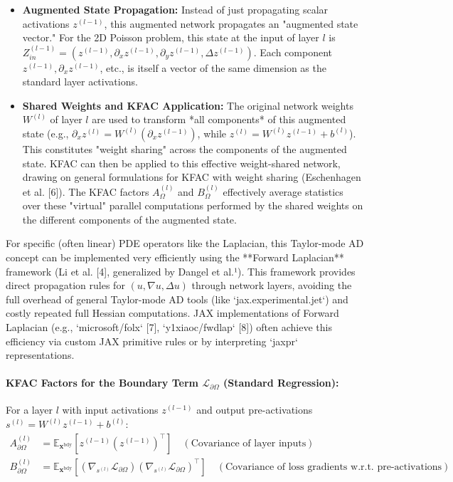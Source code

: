 \documentclass[12pt,a4paper]{article}
\newcommand{\E}{\mathbb{E}}
\newcommand{\vect}[1]{\mathbf{#1}} %
\begin{document}
\begin{itemize}
    \item \textbf{Augmented State Propagation:} Instead of just propagating scalar activations \(z^{(l-1)}\), this augmented network propagates an "augmented state vector." For the 2D Poisson problem, this state at the input of layer \(l\) is \(Z_{in}^{(l-1)} = ( z^{(l-1)}, \partial_x z^{(l-1)}, \partial_y z^{(l-1)}, \Delta z^{(l-1)} )\). Each component \(z^{(l-1)}, \partial_x z^{(l-1)}\), etc., is itself a vector of the same dimension as the standard layer activations.
    \item \textbf{Shared Weights and KFAC Application:} The original network weights \(W^{(l)}\) of layer \(l\) are used to transform *all components* of this augmented state (e.g., \(\partial_x z^{(l)} = W^{(l)} (\partial_x z^{(l-1)})\), while \(z^{(l)} = W^{(l)}z^{(l-1)} + b^{(l)}\)). This constitutes "weight sharing" across the components of the augmented state. KFAC can then be applied to this effective weight-shared network, drawing on general formulations for KFAC with weight sharing (Eschenhagen et al. [6]). The KFAC factors \(A_\Omega^{(l)}\) and \(B_\Omega^{(l)}\) effectively average statistics over these "virtual" parallel computations performed by the shared weights on the different components of the augmented state.
\end{itemize}
For specific (often linear) PDE operators like the Laplacian, this Taylor-mode AD concept can be implemented very efficiently using the **Forward Laplacian** framework (Li et al. [4], generalized by Dangel et al.¹). This framework provides direct propagation rules for \((u, \nabla u, \Delta u)\) through network layers, avoiding the full overhead of general Taylor-mode AD tools (like `jax.experimental.jet`) and costly repeated full Hessian computations. JAX implementations of Forward Laplacian (e.g., `microsoft/folx` [7], `y1xiaoc/fwdlap` [8]) often achieve this efficiency via custom JAX primitive rules or by interpreting `jaxpr` representations.

\paragraph{KFAC Factors for the Boundary Term \(\mathcal{L}_{\partial\Omega}\) (Standard Regression):}
For a layer \(l\) with input activations \(z^{(l-1)}\) and output pre-activations \(s^{(l)} = W^{(l)}z^{(l-1)} + b^{(l)}\):
\begin{align*}
A_{\partial\Omega}^{(l)} &= \E_{\vect{x}^{\text{bdy}}}\left[z^{(l-1)} (z^{(l-1)})^{\top}\right] \quad (\text{Covariance of layer inputs})\\
B_{\partial\Omega}^{(l)} &= \E_{\vect{x}^{\text{bdy}}}\left[\left(\nabla_{s^{(l)}} \mathcal{L}_{\partial\Omega}\right) \left(\nabla_{s^{(l)}} \mathcal{L}_{\partial\Omega}\right)^{\top}\right] \quad (\text{Covariance of loss gradients w.r.t. pre-activations})
\end{align*}
\end{document}
